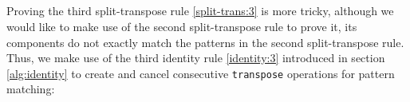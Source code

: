 \documentclass{l4proj}
\begin{document}
\begin{code}%
\>[0]\<%
\\
\>[0]\AgdaSpace{}%
\AgdaSymbol{:}%
\>[681I]\AgdaSymbol{\{}\AgdaSpace{}%
\AgdaSpace{}%
\AgdaSpace{}%
\AgdaSymbol{:}\AgdaSpace{}%
\AgdaSymbol{\}}\AgdaSpace{}%
\AgdaSpace{}%
\AgdaSymbol{\{}\AgdaSpace{}%
\AgdaSymbol{:}\AgdaSpace{}%
\AgdaSymbol{\}}\AgdaSpace{}%
\AgdaSpace{}%
\AgdaSymbol{(}\AgdaSpace{}%
\AgdaSymbol{:}\AgdaSpace{}%
\AgdaSymbol{)}\AgdaSpace{}%
\<%
\\
\>[.][@{}l@{}]\<[681I]%
\>[26]\AgdaSymbol{(}\AgdaSpace{}%
\AgdaSymbol{:}\AgdaSpace{}%
\AgdaSpace{}%
\AgdaSymbol{(}\AgdaSpace{}%
\AgdaSymbol{(}\AgdaSpace{}%
\AgdaSpace{}%
\AgdaSymbol{)}\AgdaSpace{}%
\AgdaSymbol{(}\AgdaSpace{}%
\AgdaOperator{\AgdaPrimitive{*}}\AgdaSpace{}%
\AgdaSymbol{))}\AgdaSpace{}%
\AgdaSymbol{)}\AgdaSpace{}%
\<%
\\
\>[0][@{}l@{\AgdaIndent{0}}]%
\>[2]\AgdaSpace{}%
\AgdaSymbol{(}\AgdaSpace{}%
\AgdaSymbol{(}\AgdaSpace{}%
\AgdaSpace{}%
\AgdaSymbol{\{}\AgdaSymbol{\})}\AgdaSpace{}%
\AgdaSymbol{)}\AgdaSpace{}%
\AgdaSpace{}%
\AgdaSpace{}%
\AgdaSpace{}%
\AgdaSymbol{(}\AgdaSpace{}%
\AgdaSpace{}%
\AgdaSymbol{(}\AgdaSpace{}%
\AgdaSymbol{))}\<%
\\
\>[0]\AgdaSpace{}%
\AgdaSpace{}%
\AgdaSpace{}%
\AgdaSymbol{=}\AgdaSpace{}%
\AgdaSpace{}%
\AgdaSymbol{(}\AgdaSpace{}%
\AgdaSpace{}%
\AgdaSymbol{)}\<%
\end{code}
Proving the third split-transpose rule \ref{split-trans:3} is more tricky, although we would like to make use of the second split-transpose rule to prove it, its components do not exactly match the patterns in the second split-transpose rule. Thus, we make use of the third identity rule \ref{identity:3} introduced in section \ref{alg:identity} to create and cancel consecutive \texttt{transpose} operations for pattern matching:
\end{document}
